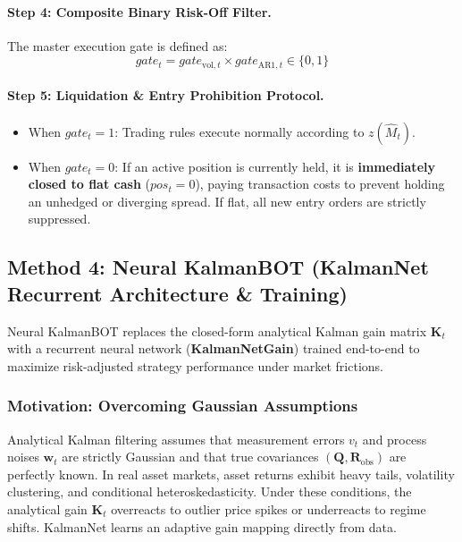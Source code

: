 \documentclass[11pt, a4paper]{article}
\begin{document}
\paragraph{Step 4: Composite Binary Risk-Off Filter.}
The master execution gate is defined as:
\begin{equation}
    gate_t = gate_{\text{vol}, t} \times gate_{\text{AR1}, t} \in \{0, 1\}
\end{equation}

\paragraph{Step 5: Liquidation \& Entry Prohibition Protocol.}
\begin{itemize}
    \item When $gate_t = 1$: Trading rules execute normally according to $z(\hat{M}_t)$.
    \item When $gate_t = 0$: If an active position is currently held, it is \textbf{immediately closed to flat cash} ($pos_t = 0$), paying transaction costs to prevent holding an unhedged or diverging spread. If flat, all new entry orders are strictly suppressed.
\end{itemize}

\subsection{Method 4: Neural KalmanBOT (KalmanNet Recurrent Architecture \& Training)}
\label{sec:method_neural}
Neural KalmanBOT replaces the closed-form analytical Kalman gain matrix $\mathbf{K}_t$ with a recurrent neural network (\textbf{KalmanNetGain}) trained end-to-end to maximize risk-adjusted strategy performance under market frictions.

\subsubsection{Motivation: Overcoming Gaussian Assumptions}
Analytical Kalman filtering assumes that measurement errors $v_t$ and process noises $\mathbf{w}_t$ are strictly Gaussian and that true covariances $(\mathbf{Q}, \mathbf{R}_{\text{obs}})$ are perfectly known. In real asset markets, asset returns exhibit heavy tails, volatility clustering, and conditional heteroskedasticity. Under these conditions, the analytical gain $\mathbf{K}_t$ overreacts to outlier price spikes or underreacts to regime shifts. KalmanNet learns an adaptive gain mapping directly from data.
\end{document}
